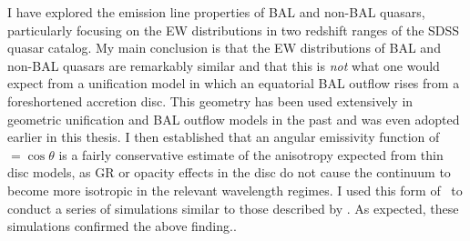 I have explored the emission line properties of BAL and non-BAL quasars,
particularly focusing on the EW distributions in two redshift ranges of the SDSS
quasar catalog. My main conclusion is that the EW distributions of BAL and
non-BAL quasars are remarkably similar and that this is {\em not} what one would expect from
a unification model in which an equatorial BAL outflow rises from a foreshortened 
accretion disc. This geometry has been used extensively in 
geometric unification and BAL outflow models in the past 
\citep[e.g.][]{MCGV95,PSK2000,PK04,risalitielvis2010,borguet2010,
higginbottom2013, nomura2013,nomura2016} and was even adopted earlier in this thesis.
I then established that an angular emissivity function of \ept$ =\cos \theta$ 
is a fairly conservative estimate of the anisotropy expected from thin disc models, 
as GR or opacity effects in the disc do not cause the continuum to become more isotropic
in the relevant wavelength regimes. I used this form of \ept\ to conduct a series of simulations 
similar to those described by \cite{risaliti2011}.
As expected, these simulations confirmed the above finding..

